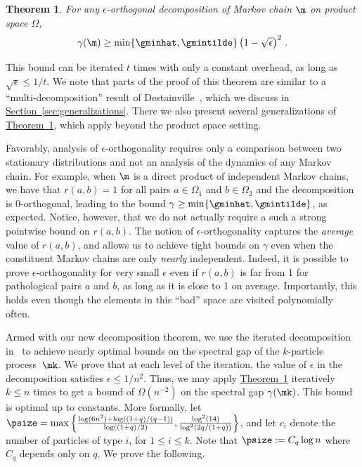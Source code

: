 \documentclass[11pt]{article}
\newtheorem{theorem}{Theorem}[section]
\providecommand{\expref}[2]{\texorpdfstring{\hyperref[#2]{#1~\ref{#2}}}{#1~\ref{#2}}}
\begin{document}
\begin{theorem}\label{thm:productspaces}
For any $\epsilon$-orthogonal decomposition of Markov chain $\m$ on 
product space $\Omega$,
\[ \gamma(\m) \geq \min\{\gminhat, \gmintilde\}\left(1 -\sqrt{\epsilon}\right)^2\,.\]
\end{theorem}


\noindent This bound can be iterated $t$ times with 
only a constant overhead, as long as $\sqrt{\epsilon}\leq 1/t$.
We note that parts of the proof of this theorem are similar
to a ``multi-decomposition'' result of Destainville~\cite{Dest03},
which we discuss in \expref{Section}{sec:generalizations}.  There we also
present several generalizations of \expref{Theorem}{thm:productspaces}, 
which apply beyond the product space setting.

Favorably, analysis of $\epsilon$-orthogonality requires only a 
comparison between two stationary distributions and not an analysis of 
the dynamics of any Markov chain.  For example, when $\m$ is a direct 
product of independent Markov chains, we have that $r(a,b)=1$ for all 
pairs $a\in\Omega_1$ and $b\in\Omega_2$ and the decomposition is 
$0$-orthogonal, leading to the bound $\gamma\geq 
\min\{\gminhat,\gmintilde\}$, as expected.  Notice, however, that we do 
not actually require a such a strong pointwise bound on $r(a,b)$.  The 
notion of $\epsilon$-orthogonality captures the \emph{average} value of 
$r(a,b)$, and allows us to achieve tight bounds on $\gamma$ even when 
the constituent Markov chains are only \emph{nearly} independent.  
Indeed, it is possible to prove %
$\epsilon$-orthogonality for very small $\epsilon$ %
even if 
$r(a,b)$ is far from 1 for pathological pairs $a$ and $b$, as long as 
it is close to 1 on average. Importantly, this holds even though the 
elements in this ``bad'' space are visited polynomially often.  

Armed with our new decomposition theorem, we use the iterated 
decomposition in~\cite{MS} to achieve nearly optimal bounds on the 
spectral gap of the $k$-particle process~$\mk$. We prove that at each
level of the iteration, %
the value of $\epsilon$ in the decomposition satisfies $\epsilon\leq 1/n^2$. %
%
Thus, we may apply \expref{Theorem}{thm:productspaces} iteratively $k\leq 
n$ times to get a bound of $\Omega(n^{-2})$ on the spectral gap 
$\gamma(\mk)$.  This bound is optimal up to constants. More formally, 
let $\psize = \max\left\{\frac{\log 
(6n^2)+\log((1+q)/(q-1))}{\log((1+q)/2)},  
\frac{\log^2(14)}{\log^2(2q/(1+q))}\right\}$, %
and let 
$c_i$ denote the number of particles of type $i$, for $1\leq i\leq k$.  
Note that $\psize := C_q \log n$  where $C_q$ depends only on $q.$
We prove the following.
\end{document}
